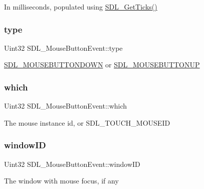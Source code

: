 In milliseconds, populated using \mbox{\hyperlink{_s_d_l__timer_8h_a0b9bc71d6287e0ffafdc3419760fe2b3}{S\+D\+L\+\_\+\+Get\+Ticks()}} \mbox{\label{struct_s_d_l___mouse_button_event_af64cb09ea68b8081ecc8ee498552e3d7}} 
\subsubsection{\texorpdfstring{type}{type}}
{\footnotesize\ttfamily Uint32 S\+D\+L\+\_\+\+Mouse\+Button\+Event\+::type}

\mbox{\hyperlink{_s_d_l__events_8h_a3b589e89be6b35c02e0dd34a55f3fccaa9267166e1536dfa8b0daa98c0afa9052}{S\+D\+L\+\_\+\+M\+O\+U\+S\+E\+B\+U\+T\+T\+O\+N\+D\+O\+WN}} or \mbox{\hyperlink{_s_d_l__events_8h_a3b589e89be6b35c02e0dd34a55f3fccaa4ab85278398d29b9e50f500aad2b952b}{S\+D\+L\+\_\+\+M\+O\+U\+S\+E\+B\+U\+T\+T\+O\+N\+UP}} \mbox{\label{struct_s_d_l___mouse_button_event_a366aef59a0f393afc8a3561e741825df}} 
\subsubsection{\texorpdfstring{which}{which}}
{\footnotesize\ttfamily Uint32 S\+D\+L\+\_\+\+Mouse\+Button\+Event\+::which}

The mouse instance id, or S\+D\+L\+\_\+\+T\+O\+U\+C\+H\+\_\+\+M\+O\+U\+S\+E\+ID \mbox{\label{struct_s_d_l___mouse_button_event_ab3b855d4b543b5d02fcf5d56e4421393}} 
\subsubsection{\texorpdfstring{windowID}{windowID}}
{\footnotesize\ttfamily Uint32 S\+D\+L\+\_\+\+Mouse\+Button\+Event\+::window\+ID}

The window with mouse focus, if any \mbox{\label{struct_s_d_l___mouse_button_event_a5bb9c61b86e999f58637511e32e3a076}} 
